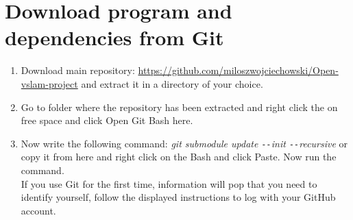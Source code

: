 \documentclass[a4paper,12pt]{book}
\begin{document}
\section{Download program and dependencies from Git}
\begin{enumerate}
	\item Download main repository: \url{https://github.com/miloszwojciechowski/Open-vslam-project} and extract it in a directory of your choice.
	\item \begin{minipage}[t]{\linewidth}
		\raggedright
		\medskip	
	\end{minipage}
	Go to folder where the repository has been extracted and right click the on free space and click Open Git Bash here.
	\item \begin{minipage}[t]{\linewidth}
		\raggedright
		\medskip	
	\end{minipage}
	Now write the following command: \textit{git submodule update \texttt{-{}-}init \texttt{-{}-}recursive} or copy it from here and right click on the Bash and click Paste. Now run the command. \\
	If you use Git for the first time, information will pop that you need to identify yourself, follow the displayed instructions to log with your GitHub account.\\

\end{enumerate}
\end{document}
